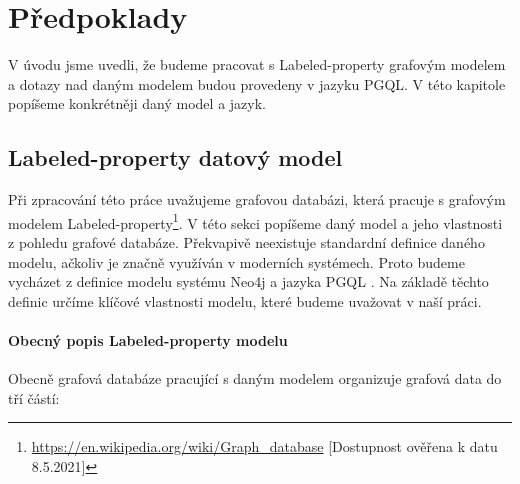 \chapter{Předpoklady}
\label{requirements}

V úvodu jsme uvedli, že budeme pracovat s Labeled-property grafovým modelem a dotazy nad daným modelem budou provedeny v jazyku PGQL.
V této kapitole popíšeme konkrétněji daný model a jazyk.

\section{Labeled-property datový model}
\label{req.propGraph}

Při zpracování této práce uvažujeme grafovou databázi, která pracuje s grafovým modelem Labeled-property\footnote{\url{https://en.wikipedia.org/wiki/Graph_database} [Dostupnost ověřena k datu 8.5.2021]}.
V této sekci popíšeme daný model a jeho vlastnosti z pohledu grafové databáze.
Překvapivě neexistuje standardní definice daného modelu, ačkoliv je značně využíván v moderních systémech.
Proto budeme vycházet z definice modelu systému Neo4j \citep{neopropertygraph} a jazyka PGQL \citep{pgql}.
Na základě těchto definic určíme klíčové vlastnosti modelu, které budeme uvažovat v naší práci.

\subsubsection{Obecný popis Labeled-property modelu}

Obecně grafová databáze pracující s daným modelem organizuje grafová data do tří částí:

